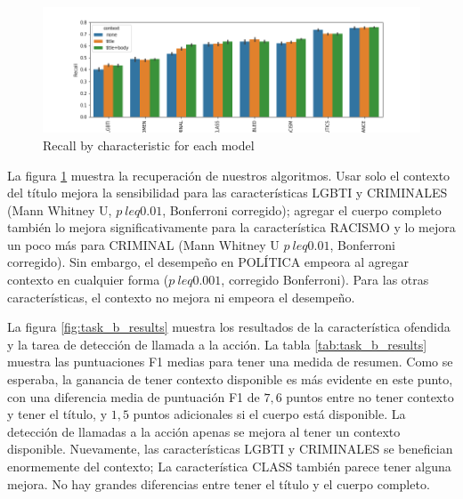 \begin{figure}[t]
    \centering
    \includegraphics[width=\textwidth]{img/recall_category.png}
    \caption{Recall by characteristic for each model}
    \label{fig:recall_by_characteristic}
\end{figure}

La figura \ref{fig:recall_by_characteristic} muestra la recuperación de nuestros algoritmos. Usar solo el contexto del título mejora la sensibilidad para las características LGBTI y CRIMINALES (Mann Whitney U, $ p \ leq 0.01 $, Bonferroni corregido); agregar el cuerpo completo también lo mejora significativamente para la característica RACISMO y lo mejora un poco más para CRIMINAL (Mann Whitney U $ p \ leq 0.01 $, Bonferroni corregido). Sin embargo, el desempeño en POLÍTICA empeora al agregar contexto en cualquier forma ($ p \ leq 0.001 $, corregido Bonferroni). Para las otras características, el contexto no mejora ni empeora el desempeño.



La figura \ref{fig:task_b_results} muestra los resultados de la característica ofendida y la tarea de detección de llamada a la acción. La tabla \ref{tab:task_b_results} muestra las puntuaciones F1 medias para tener una medida de resumen. Como se esperaba, la ganancia de tener contexto disponible es más evidente en este punto, con una diferencia media de puntuación F1 de $ 7,6 $ puntos entre no tener contexto y tener el título, y $ 1,5 $ puntos adicionales si el cuerpo está disponible. La detección de llamadas a la acción apenas se mejora al tener un contexto disponible. Nuevamente, las características LGBTI y CRIMINALES se benefician enormemente del contexto; La característica CLASS también parece tener alguna mejora. No hay grandes diferencias entre tener el título y el cuerpo completo.

